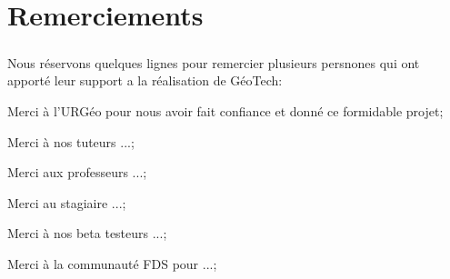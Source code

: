 \chapter{Remerciements}
\paragraph{}
Nous réservons quelques lignes pour remercier plusieurs persnones qui ont apporté 
leur support a la réalisation de GéoTech: \par 
    Merci à l'URGéo pour nous avoir fait confiance et donné ce formidable projet; \par 
    Merci à nos tuteurs ...; \par 
    Merci aux professeurs ...; \par 
    Merci au stagiaire ...; \par 
    Merci à nos beta testeurs ...; \par
    Merci à la communauté FDS pour ...; \par 